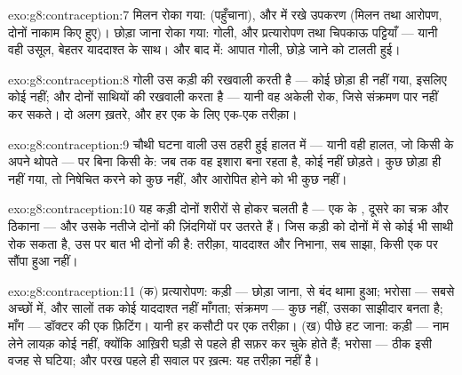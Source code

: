 \begin{solution}{exo:g8:contraception:7}
मिलन रोका गया:  (पहुँचाना), और  में रखे उपकरण (मिलन तथा
आरोपण, दोनों नाकाम किए हुए)। छोड़ा जाना रोका गया: गोली, और प्रत्यारोपण
तथा चिपकाऊ पट्टियाँ --- यानी वही उसूल, बेहतर याददाश्त के साथ। और बाद
में: आपात गोली, छोड़े जाने को टालती हुई।
\end{solution}

\begin{solution}{exo:g8:contraception:8}
गोली उस कड़ी की रखवाली करती है --- कोई  छोड़ा ही नहीं गया, इसलिए
कोई  नहीं; और  दोनों साथियों की रखवाली करता है --- यानी
वह अकेली रोक, जिसे संक्रमण पार नहीं कर सकते। दो अलग ख़तरे, और हर एक के
लिए एक-एक तरीक़ा।
\end{solution}

\begin{solution}{exo:g8:contraception:9}
चौथी घटना वाली उस ठहरी हुई हालत में --- यानी वही हालत, जो किसी
 के अपने  थोपते --- पर बिना किसी  के: जब तक
वह इशारा बना रहता है,  कोई  नहीं छोड़ते। कुछ छोड़ा ही नहीं
गया, तो निषेचित करने को कुछ नहीं, और आरोपित होने को भी कुछ नहीं।
\end{solution}

\begin{solution}{exo:g8:contraception:10}
यह कड़ी दोनों शरीरों से होकर चलती है --- एक के , दूसरे का चक्र और
ठिकाना --- और उसके नतीजे दोनों की ज़िंदगियों पर उतरते हैं। जिस कड़ी को
दोनों में से कोई भी साथी रोक सकता है, उस पर बात भी दोनों की है: तरीक़ा,
याददाश्त और निभाना, सब साझा, किसी एक पर सौंपा हुआ नहीं।
\end{solution}

\begin{solution}{exo:g8:contraception:11}
(क) प्रत्यारोपण: कड़ी --- छोड़ा जाना,  से बंद थामा हुआ; भरोसा ---
सबसे अच्छों में, और सालों तक कोई याददाश्त नहीं माँगता; संक्रमण --- कुछ
नहीं,  उसका साझीदार बनता है; माँग --- डॉक्टर की एक फ़िटिंग। यानी हर
कसौटी पर एक तरीक़ा। (ख) पीछे हट जाना: कड़ी --- नाम लेने लायक़ कोई नहीं,
क्योंकि  आख़िरी घड़ी से पहले ही सफ़र कर चुके होते हैं; भरोसा ---
ठीक इसी वजह से घटिया; और परख पहले ही सवाल पर ख़त्म: यह तरीक़ा नहीं है।
\end{solution}


